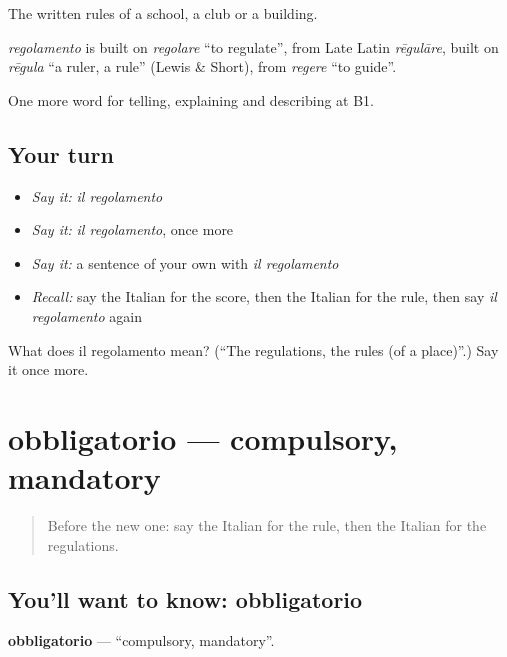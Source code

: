The written rules of a school, a club or a building.

\begin{cousinweb}
\emph{regolamento} is built on \emph{regolare} \textquotedblleft{}to regulate\textquotedblright{}, from Late Latin \emph{rēgulāre}, built on \emph{rēgula} \textquotedblleft{}a ruler, a rule\textquotedblright{} (Lewis \& Short), from \emph{regere} \textquotedblleft{}to guide\textquotedblright{}.
\end{cousinweb}

\begin{grammarlens}[title={What you've built}]
One more word for telling, explaining and describing at B1.
\end{grammarlens}

\subsection*{Your turn}
\begin{itemize}
\raggedright
  \item \emph{Say it:} \emph{il regolamento}
  \item \emph{Say it:} \emph{il regolamento}, once more
  \item \emph{Say it:} a sentence of your own with \emph{il regolamento}
  \item \emph{Recall:} say the Italian for the score, then the Italian for the rule, then say \emph{il regolamento} again
\end{itemize}

\begin{tcolorbox}[breakable,colback=teal!4,colframe=teal!35!black,title={Before you move on}]
What does il regolamento mean? (\textquotedblleft{}The regulations, the rules (of a place)\textquotedblright{}.) Say it once more.
\end{tcolorbox}
\section[obbligatorio]{obbligatorio — compulsory, mandatory}

\label{lesson:IT-C384-obbligatorio}



\begin{quote}
Before the new one: say the Italian for the rule, then the Italian for the regulations.
\end{quote}

\subsection*{You'll want to know: obbligatorio}
\textbf{obbligatorio} — \textquotedblleft{}compulsory, mandatory\textquotedblright{}.

